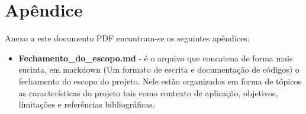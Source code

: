 \section*{Apêndice}

Anexo a este documento PDF encontram-se os seguintes apêndices:

\begin{itemize}
    \item \textbf{Fechamento\_do\_escopo.md} - é o arquivo que concatena de forma mais sucinta, em markdown (Um formato de escrita e documentação de códigos) o fechamento do escopo do projeto. Nele estão organizados em forma de tópicos as características do projeto tais como contexto de aplicação, objetivos, limitações e referências bibliográficas.
\end{itemize}




